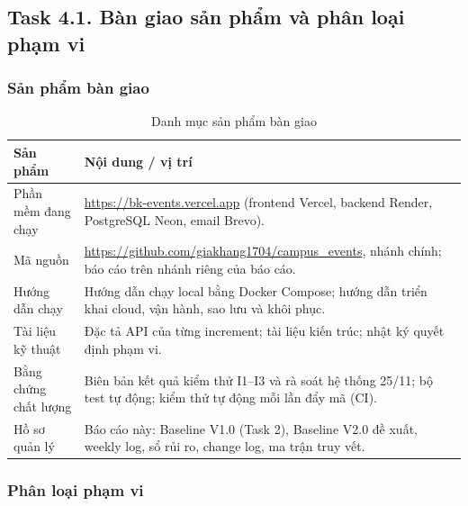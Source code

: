 \subsection{Task 4.1. Bàn giao sản phẩm và phân loại phạm vi}
\label{sec:t4-delivery}

\subsubsection{Sản phẩm bàn giao}

\begin{table}[H]
\centering\small
\caption{Danh mục sản phẩm bàn giao}\label{tab:t4-deliverables}
\begin{tabularx}{\linewidth}{@{}p{.28\linewidth}X@{}}
\toprule
\textbf{Sản phẩm} & \textbf{Nội dung / vị trí}\\\midrule
Phần mềm đang chạy & \url{https://bk-events.vercel.app} (frontend Vercel, backend Render, PostgreSQL Neon, email Brevo).\\
Mã nguồn & \url{https://github.com/giakhang1704/campus_events}, nhánh chính; báo cáo trên nhánh riêng của báo cáo.\\
Hướng dẫn chạy & Hướng dẫn chạy local bằng Docker Compose; hướng dẫn triển khai cloud, vận hành, sao lưu và khôi phục.\\
Tài liệu kỹ thuật & Đặc tả API của từng increment; tài liệu kiến trúc; nhật ký quyết định phạm vi.\\
Bằng chứng chất lượng & Biên bản kết quả kiểm thử I1--I3 và rà soát hệ thống 25/11; bộ test tự động; kiểm thử tự động mỗi lần đẩy mã (CI).\\
Hồ sơ quản lý & Báo cáo này: Baseline V1.0 (Task 2), Baseline V2.0 đề xuất, weekly log, sổ rủi ro, change log, ma trận truy vết.\\
\bottomrule
\end{tabularx}
\end{table}

\subsubsection{Phân loại phạm vi}

